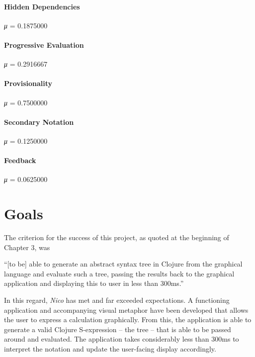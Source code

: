 \documentclass[12pt,twoside,notitlepage,xetex]{report}
\begin{document}
\paragraph{Hidden Dependencies}\hfill

\emph{μ} = 0.1875000

\paragraph{Progressive Evaluation}\hfill

\emph{μ} = 0.2916667

\paragraph{Provisionality}\hfill

\emph{μ} = 0.7500000

\paragraph{Secondary Notation}\hfill

\emph{μ} = 0.1250000

\paragraph{Feedback}\hfill

\emph{μ} = 0.0625000

\section{Goals}
The criterion for the success of this project, as quoted at the beginning of Chapter 3, was
\begin{center}
\parbox[c]{\textwidth-2cm}{
\small
``[to be] able to generate an abstract syntax tree in Clojure from the graphical language and evaluate such a tree, passing the results back to the graphical application and displaying this to user in less than 300ms.''
}
\end{center}
In this regard, \emph{Nico} has met and far exceeded expectations.  A functioning application and accompanying visual metaphor have been developed that allows the user to express a calculation graphically.  From this, the application is able to generate a valid Clojure S-expression -- the tree -- that is able to be passed around and evaluated.  The application takes considerably less than 300ms to interpret the notation and update the user-facing display accordingly.
\end{document}
